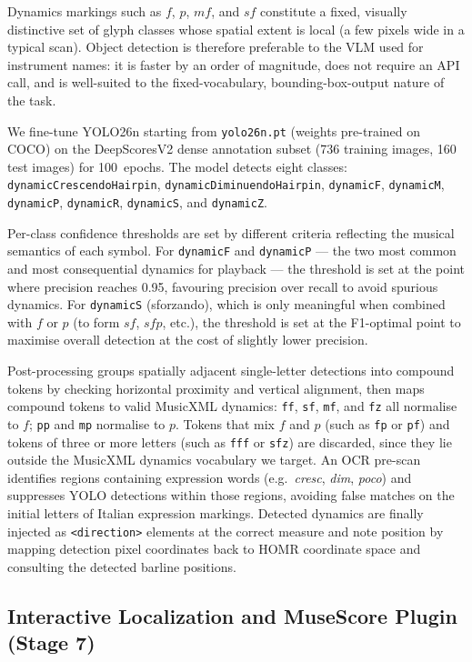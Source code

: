 \documentclass[11pt,a4paper]{article}
\begin{document}
Dynamics markings such as $f$, $p$, $mf$, and $sf$ constitute a fixed, visually distinctive set of glyph classes whose spatial extent is local (a few pixels wide in a typical scan).
Object detection is therefore preferable to the VLM used for instrument names: it is faster by an order of magnitude, does not require an API call, and is well-suited to the fixed-vocabulary, bounding-box-output nature of the task.

We fine-tune YOLO26n starting from \texttt{yolo26n.pt} (weights pre-trained on COCO) on the DeepScoresV2 dense annotation subset (736 training images, 160 test images) for 100~epochs.
The model detects eight classes: \texttt{dynamic\-Crescendo\-Hairpin}, \texttt{dynamic\-Diminuendo\-Hairpin}, \texttt{dynamicF}, \texttt{dynamicM}, \texttt{dynamicP}, \texttt{dynamicR}, \texttt{dynamicS}, and \texttt{dynamicZ}.

Per-class confidence thresholds are set by different criteria reflecting the musical semantics of each symbol.
For \texttt{dynamicF} and \texttt{dynamicP} — the two most common and most consequential dynamics for playback — the threshold is set at the point where precision reaches 0.95, favouring precision over recall to avoid spurious dynamics.
For \texttt{dynamicS} (sforzando), which is only meaningful when combined with $f$ or $p$ (to form $sf$, $sfp$, etc.), the threshold is set at the F1-optimal point to maximise overall detection at the cost of slightly lower precision.

Post-processing groups spatially adjacent single-letter detections into compound tokens by checking horizontal proximity and vertical alignment, then maps compound tokens to valid MusicXML dynamics: \texttt{ff}, \texttt{sf}, \texttt{mf}, and \texttt{fz} all normalise to $f$; \texttt{pp} and \texttt{mp} normalise to $p$.
Tokens that mix $f$ and $p$ (such as \texttt{fp} or \texttt{pf}) and tokens of three or more letters (such as \texttt{fff} or \texttt{sfz}) are discarded, since they lie outside the MusicXML dynamics vocabulary we target.
An OCR pre-scan identifies regions containing expression words (e.g.\ \textit{cresc}, \textit{dim}, \textit{poco}) and suppresses YOLO detections within those regions, avoiding false matches on the initial letters of Italian expression markings.
Detected dynamics are finally injected as \texttt{<direction>} elements at the correct measure and note position by mapping detection pixel coordinates back to HOMR coordinate space and consulting the detected barline positions.

\subsection{Interactive Localization and MuseScore Plugin (Stage 7)}
\end{document}
